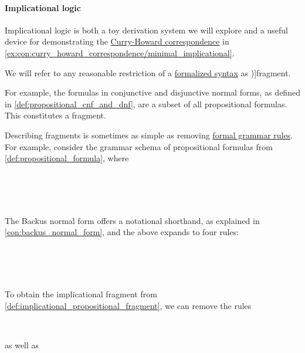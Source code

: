 \paragraph{Implicational logic}

Implicational logic is both a toy derivation system we will explore and a useful device for demonstrating the \hyperref[con:curry_howard_correspondence]{Curry-Howard correspondence} in \cref{ex:con:curry_howard_correspondence/minimal_implicational}.

\begin{concept}\label{con:syntax_fragment}\mimprovised
  We will refer to any reasonable restriction of a \hyperref[con:syntax_semantics_duality]{formalized syntax} as \term[en=fragment (\cite[\S 2.2.6]{Mimram2020ProgramEqualsProof})]{fragment}.

  For example, the formulas in conjunctive and disjunctive normal forms, as defined in \cref{def:propositional_cnf_and_dnf}, are a subset of all propositional formulas. This constitutes a fragment.

  Describing fragments is sometimes as simple as removing \hyperref[def:formal_grammar]{formal grammar rules}. For example, consider the grammar schema of propositional formulas from \cref{def:propositional_formula}, where
  \begin{bnf*}
                { \bnfor} \\
     \\
     \\
  \end{bnf*}

  The Backus normal form offers a notational shorthand, as explained in \cref{con:backus_normal_form}, and the above expands to four rules:
  \begin{bnf*}
                { \bnfor} \\
                { \bnfor} \\
                { \bnfor} \\
                {}
  \end{bnf*}

  To obtain the implicational fragment from \cref{def:implicational_propositional_fragment}, we can remove the rules
  \begin{bnf*}
                {} \\
                {}
  \end{bnf*}
  as well as
  \begin{bnf*}
             {\bnftsq{\( \synwedge \)}} \\
             {\bnftsq{\( \synimplies \)}} \\
             {\bnftsq{\( \syniff \)}}
  \end{bnf*}


\end{concept}
